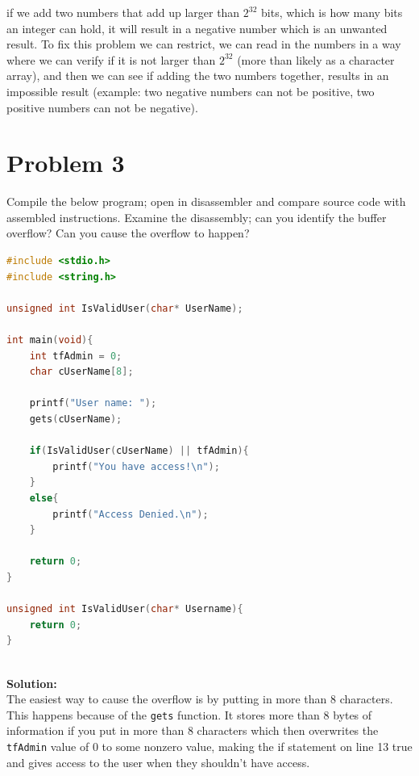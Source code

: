\documentclass[12pt]{article}
\newcommand\tab[1][0.5cm]{\hspace*{#1}}
\begin{document}
if we add two numbers that add up larger than $2^32$ bits, which is how many bits an integer can hold, it will result in a negative number which is an unwanted result. To fix this problem we can restrict, we can read in the numbers in a way where we can verify if it is not larger than $2^32$ (more than likely as a character array), and then we can see if adding the two numbers together, results in an impossible result (example: two negative numbers can not be positive, two positive numbers can not be negative).


\section{Problem 3}
\tab Compile the below program; open in disassembler and compare source code with assembled instructions. 
Examine the disassembly; can you identify the buffer overflow? Can you cause the overflow to happen?

\begin{lstlisting}[language=C]
#include <stdio.h>
#include <string.h>

unsigned int IsValidUser(char* UserName);

int main(void){
	int tfAdmin = 0;
	char cUserName[8];

	printf("User name: ");
	gets(cUserName);

	if(IsValidUser(cUserName) || tfAdmin){
		printf("You have access!\n");
	}
	else{
		printf("Access Denied.\n");
	}

	return 0;
}

unsigned int IsValidUser(char* Username){
	return 0;
}
\end{lstlisting}
\textbf{\\Solution:\\}
\tab The easiest way to cause the overflow is by putting in more than 8 characters. This happens because 
of the \texttt{gets} function. It stores more than 8 bytes of information if you put in more than 8 characters
which then overwrites the \texttt{tfAdmin} value of 0 to some nonzero value, making the if statement on line 13 true
and gives access to the user when they shouldn't have access. 
\end{document}

